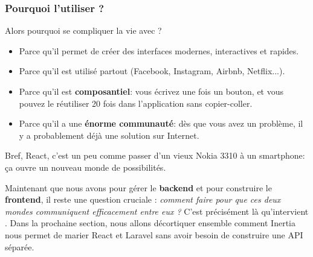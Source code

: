 \subsubsection[Pourquoi l'utiliser ?]{Pourquoi l'utiliser ?}

Alors pourquoi se compliquer la vie avec \react{}?

\begin{itemize}
    \item Parce qu’il permet de créer des interfaces modernes, interactives et rapides.
    \item Parce qu’il est utilisé partout (Facebook, Instagram, Airbnb, Netflix...).
    \item Parce qu’il est \textbf{composantiel}: vous écrivez une fois un bouton, et vous pouvez le réutiliser 20 fois dans l’application sans copier-coller.
    \item Parce qu’il a une \textbf{énorme communauté}: dès que vous avez un problème, il y a probablement déjà une solution sur Internet.
\end{itemize}

Bref, React, c’est un peu comme passer d’un vieux Nokia 3310 à un smartphone: ça ouvre un nouveau monde de possibilités. 
\vsp

Maintenant que nous avons \laravel{} pour gérer le \textbf{backend} et \react{} pour construire le \textbf{frontend}, 
il reste une question cruciale : \textit{comment faire pour que ces deux mondes communiquent efficacement entre eux ?}  
C’est précisément là qu’intervient \inertia{} .  
Dans la prochaine section, nous allons décortiquer ensemble comment Inertia nous permet de marier React et Laravel 
sans avoir besoin de construire une API séparée.